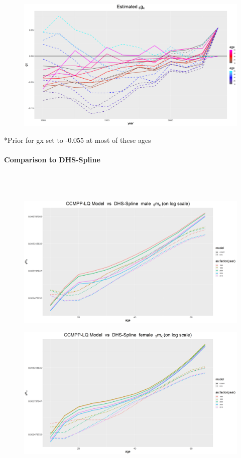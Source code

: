 \documentclass[12pt,a4paper]{article}
\begin{document}
\begin{figure}[H]
\includegraphics[width=\linewidth]{Burkina Faso/gx 15 to 60.png}
\end{figure}

*Prior for gx set to -0.055 at most of these ages

\newpage
\paragraph{Comparison to DHS-Spline} \\~\\
\begin{figure}[H]
\includegraphics[width=\linewidth]{Burkina Faso/compare DHS males year.png}
\end{figure}
\begin{figure}[H]
\includegraphics[width=\linewidth]{Burkina Faso/compare DHS females year.png}
\end{figure}
\end{document}
